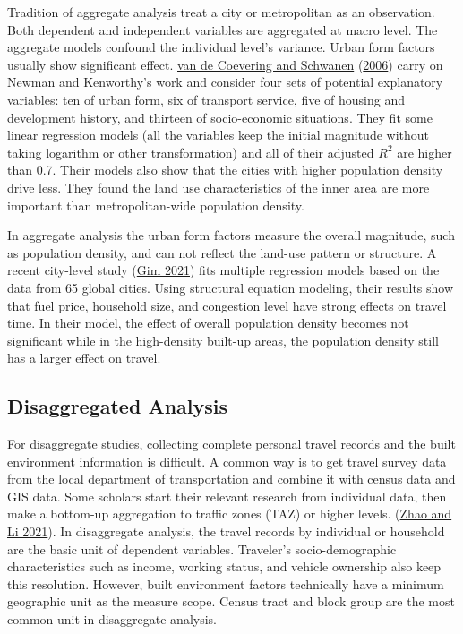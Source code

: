 \documentclass[
  11pt,
  openany]{memoir}
\begin{document}
Tradition of aggregate analysis treat a city or metropolitan as an observation. Both dependent and independent variables are aggregated at macro level. The aggregate models confound the individual level's variance. Urban form factors usually show significant effect.
\protect\hyperlink{ref-vandecoeveringReevaluatingImpactUrban2006}{van de Coevering and Schwanen} (\protect\hyperlink{ref-vandecoeveringReevaluatingImpactUrban2006}{2006}) carry on Newman and Kenworthy's work and consider four sets of potential explanatory variables: ten of urban form, six of transport service, five of housing and development history, and thirteen of socio-economic situations. They fit some linear regression models (all the variables keep the initial magnitude without taking logarithm or other transformation) and all of their adjusted \(R^2\) are higher than 0.7. Their models also show that the cities with higher population density drive less. They found the land use characteristics of the inner area are more important than metropolitan-wide population density.

In aggregate analysis the urban form factors measure the overall magnitude, such as population density, and can not reflect the land-use pattern or structure.
A recent city-level study (\protect\hyperlink{ref-gimAnalyzingCitylevelEffects2021}{Gim 2021}) fits multiple regression models based on the data from 65 global cities. Using structural equation modeling, their results show that fuel price, household size, and congestion level have strong effects on travel time. In their model, the effect of overall population density becomes not significant while in the high-density built-up areas, the population density still has a larger effect on travel.

\hypertarget{disaggregated-analysis}{%
\subsection{Disaggregated Analysis}\label{disaggregated-analysis}}

For disaggregate studies, collecting complete personal travel records and the built environment information is difficult. A common way is to get travel survey data from the local department of transportation and combine it with census data and GIS data. Some scholars start their relevant research from individual data, then make a bottom-up aggregation to traffic zones (TAZ) or higher levels. (\protect\hyperlink{ref-zhaoRethinkingDeterminantsVehicle2021}{Zhao and Li 2021}).
In disaggregate analysis, the travel records by individual or household are the basic unit of dependent variables. Traveler's socio-demographic characteristics such as income, working status, and vehicle ownership also keep this resolution. However, built environment factors technically have a minimum geographic unit as the measure scope. Census tract and block group are the most common unit in disaggregate analysis.
\end{document}
